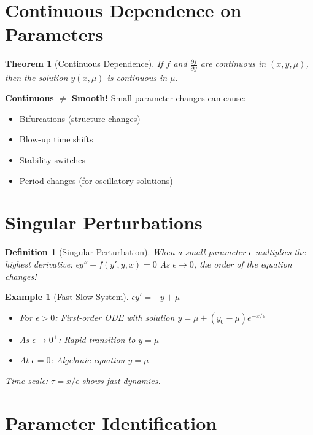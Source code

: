 \documentclass[12pt]{article}
\newtheorem{definition}{Definition}
\newtheorem{theorem}{Theorem}
\newtheorem{example}{Example}
\begin{document}
\section{Continuous Dependence on Parameters}

\begin{theorem}[Continuous Dependence]
If $f$ and $\frac{\partial f}{\partial y}$ are continuous in $(x, y, \mu)$, then the solution $y(x, \mu)$ is continuous in $\mu$.
\end{theorem}

\begin{warning}
\textbf{Continuous $\neq$ Smooth!}
Small parameter changes can cause:
\begin{itemize}
    \item Bifurcations (structure changes)
    \item Blow-up time shifts
    \item Stability switches
    \item Period changes (for oscillatory solutions)
\end{itemize}
\end{warning}

\section{Singular Perturbations}

\begin{definition}[Singular Perturbation]
When a small parameter $\epsilon$ multiplies the highest derivative:
$\epsilon y'' + f(y', y, x) = 0$
As $\epsilon \to 0$, the order of the equation changes!
\end{definition}

\begin{example}[Fast-Slow System]
$\epsilon y' = -y + \mu$

\begin{itemize}
    \item For $\epsilon > 0$: First-order ODE with solution $y = \mu + (y_0 - \mu)e^{-x/\epsilon}$
    \item As $\epsilon \to 0^+$: Rapid transition to $y = \mu$
    \item At $\epsilon = 0$: Algebraic equation $y = \mu$
\end{itemize}

Time scale: $\tau = x/\epsilon$ shows fast dynamics.
\end{example}

\section{Parameter Identification}
\end{document}
